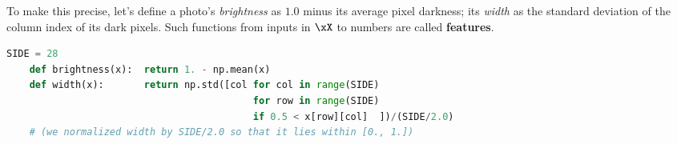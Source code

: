   To make this precise, let's define a photo's \emph{brightness} as $1.0$ minus
  its average pixel darkness; its \emph{width} as the standard deviation of
  the column index of its dark pixels.
    Such
  functions from inputs in $\xX$ to numbers are called
  \textbf{features}.
  \begin{lstlisting}[language=Python, basicstyle=\footnotesize\ttfamily]
    SIDE = 28
    def brightness(x):  return 1. - np.mean(x)
    def width(x):       return np.std([col for col in range(SIDE)
                                           for row in range(SIDE)
                                           if 0.5 < x[row][col]  ])/(SIDE/2.0)
    # (we normalized width by SIDE/2.0 so that it lies within [0., 1.]) 
  \end{lstlisting}
